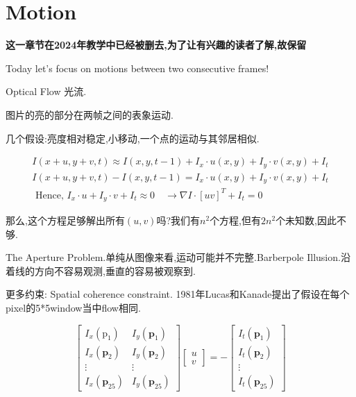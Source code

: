 \section{Motion}

\textbf{这一章节在2024年教学中已经被删去,为了让有兴趣的读者了解,故保留}

	Today let’s focus on motions between two consecutive frames!
	
	Optical Flow 光流.
	
	图片的亮的部分在两帧之间的表象运动.
	
	几个假设:亮度相对稳定,小移动,一个点的运动与其邻居相似.
	
	\begin{equation}
		\begin{array}{l}
			I(x+u, y+v, t) \approx I(x, y, t-1)+I_{x} \cdot u(x, y)+I_{y} \cdot v(x, y)+I_{t} \\
			I(x+u, y+v, t)-I(x, y, t-1)=I_{x} \cdot u(x, y)+I_{y} \cdot v(x, y)+I_{t} \\
			\text { Hence, } I_{x} \cdot u+I_{y} \cdot v+I_{t} \approx 0 \quad \rightarrow \nabla I \cdot[u v]^{T}+I_{t}=0
		\end{array}
	\end{equation}

	那么,这个方程足够解出所有$(u, v)$吗?我们有$n^2$个方程,但有$2n^2$个未知数,因此不够.
	
	The Aperture Problem.单纯从图像来看,运动可能并不完整.Barberpole Illusion.沿着线的方向不容易观测,垂直的容易被观察到.
	
	更多约束: Spatial coherence constraint. 1981年Lucas和Kanade提出了假设在每个pixel的5*5window当中flow相同.
	
	\begin{equation}
		\left[\begin{array}{cc}
			I_{x}\left(\mathrm{p}_{1}\right) & I_{y}\left(\mathbf{p}_{1}\right) \\
			I_{x}\left(\mathbf{p}_{2}\right) & I_{y}\left(\mathbf{p}_{2}\right) \\
			\vdots & \vdots \\
			I_{x}\left(\mathbf{p}_{25}\right) & I_{y}\left(\mathbf{p}_{25}\right)
		\end{array}\right]\left[\begin{array}{l}
			u \\
			v
		\end{array}\right]=-\left[\begin{array}{c}
			I_{t}\left(\mathbf{p}_{1}\right) \\
			I_{t}\left(\mathbf{p}_{2}\right) \\
			\vdots \\
			I_{t}\left(\mathbf{p}_{25}\right)
		\end{array}\right]
	\end{equation}

